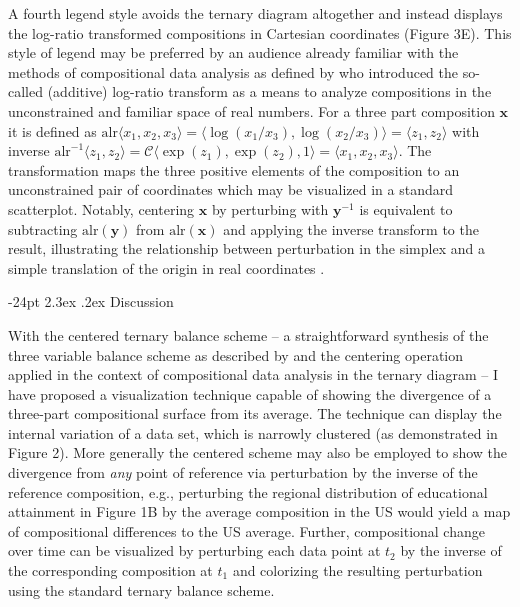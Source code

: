 \documentclass[10pt, twoside, parskip=half]{article}
\makeatletter
\renewcommand\section{\@startsection {section}{1}{\z@}%
                                   {-24pt}%
                                   {2.3ex \@plus.2ex}%
                                   {\normalfont\large\bfseries}}
\makeatother
\begin{document}
A fourth legend style avoids the ternary diagram altogether and instead
displays the log-ratio transformed compositions in Cartesian coordinates
(Figure 3E). This style of legend may be preferred by an audience
already familiar with the methods of compositional data analysis as
defined by \citet{Aitchison1982} who introduced the so-called (additive)
log-ratio transform as a means to analyze compositions in the
unconstrained and familiar space of real numbers. For a three part
composition \(\mathbf{x}\) it is defined as
\(\text{alr} \langle x_1, x_2, x_3 \rangle = \langle \log (x_1/x_3), \log (x_2/x_3) \rangle = \langle z_1,z_2 \rangle\)
with inverse
\(\text{alr}^{-1}\langle z_1,z_2 \rangle=\mathcal{C}\langle \exp(z_1), \exp (z_2), 1 \rangle = \langle x_1, x_2, x_3 \rangle\).
The transformation maps the three positive elements of the composition
to an unconstrained pair of coordinates which may be visualized in a
standard scatterplot. Notably, centering \(\mathbf{x}\) by perturbing
with \(\mathbf{y}^{-1}\) is equivalent to subtracting
\(\text{alr}(\mathbf{y})\) from \(\text{alr}(\mathbf{x})\) and applying
the inverse transform to the result, illustrating the relationship
between perturbation in the simplex and a simple translation of the
origin in real coordinates \citep{Aitchison2005a}.

\hypertarget{discussion}{%
\section{Discussion}\label{discussion}}

With the centered ternary balance scheme -- a straightforward synthesis
of the three variable balance scheme as described by \citet{Brewer1994}
and the centering operation applied in the context of compositional data
analysis in the ternary diagram \citep{VonEynatten2002} -- I have
proposed a visualization technique capable of showing the divergence of
a three-part compositional surface from its average. The technique can
display the internal variation of a data set, which is narrowly
clustered (as demonstrated in Figure 2). More generally the centered
scheme may also be employed to show the divergence from \emph{any} point
of reference via perturbation by the inverse of the reference
composition, e.g., perturbing the regional distribution of educational
attainment in Figure 1B by the average composition in the US would yield
a map of compositional differences to the US average. Further,
compositional change over time can be visualized by perturbing each data
point at \(t_2\) by the inverse of the corresponding composition at
\(t_1\) \citep{Aitchison2005a} and colorizing the resulting perturbation
using the standard ternary balance scheme.
\end{document}
